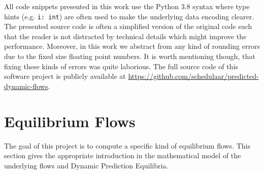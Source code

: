 \documentclass[titlepage]{scrartcl}
\theoremstyle{definition}
\newcommand{\code}[1]{\texttt{#1}}
\begin{document}
    All code snippets presented in this work use the Python 3.8 syntax where type hints (e.g. \code{i: int}) are often used to make the underlying data encoding clearer.
    The presented source code is often a simplified version of the original code such that the reader is not distracted by technical details which might improve the performance.
    Moreover, in this work we abstract from any kind of rounding errors due to the fixed size floating point numbers.
    It is worth mentioning though, that fixing these kinds of errors was quite laborious. 
    The full source code of this software project is publicly available at \url{https://github.com/schedulaar/predicted-dynamic-flows}.

    \clearpage
    

    \clearpage
    \section{Equilibrium Flows}\label{sec:equilibrium-flows}

    The goal of this project is to compute a specific kind of equilibrium flows.
    This section gives the appropriate introduction in the mathematical model of the underlying flows and Dynamic Prediction Equilibria.
    
    
    

    \clearpage
    
    
    \clearpage
    

    \clearpage
    \printbibliography
\end{document}
